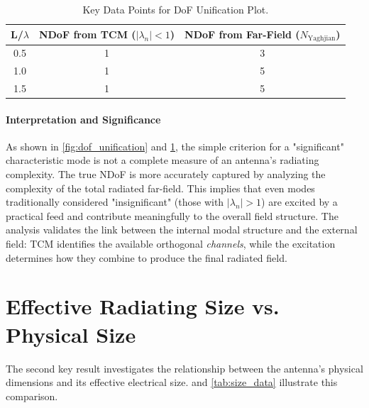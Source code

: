 \documentclass[11pt, a4paper]{report}
\begin{document}
\begin{table}[H]
\centering
\caption{Key Data Points for DoF Unification Plot.}
\label{tab:dof_data}
\begin{tabular}{@{}ccc@{}}
\toprule
\textbf{L/$\lambda$} & \textbf{NDoF from TCM ($|\lambda_n|<1$)} & \textbf{NDoF from Far-Field ($N_{\text{Yaghjian}}$)} \\ \midrule
0.5 & 1 & 3 \\
1.0 & 1 & 5 \\
1.5 & 1 & 5 \\ \bottomrule
\end{tabular}
\end{table}

\paragraph{Interpretation and Significance}
As shown in \cref{fig:dof_unification} and \cref{tab:dof_data}, the simple criterion for a "significant" characteristic mode is not a complete measure of an antenna's radiating complexity. The true NDoF is more accurately captured by analyzing the complexity of the total radiated far-field. This implies that even modes traditionally considered "insignificant" (those with $|\lambda_n| > 1$) are excited by a practical feed and contribute meaningfully to the overall field structure. The analysis validates the link between the internal modal structure and the external field: TCM identifies the available orthogonal \textit{channels}, while the excitation determines how they combine to produce the final radiated field.

\section{Effective Radiating Size vs. Physical Size}
The second key result investigates the relationship between the antenna's physical dimensions and its effective electrical size.  and \cref{tab:size_data} illustrate this comparison.
\end{document}
